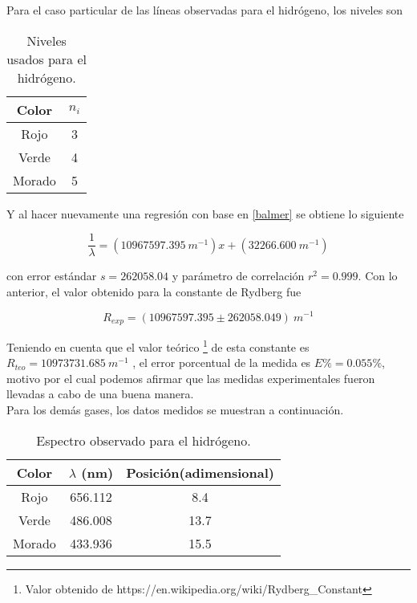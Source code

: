 \documentclass[prb,aps,twocolumn,preprintnumbers,amsmath,amssymb]{revtex4}
\begin{document}
Para el caso particular de las líneas observadas para el hidrógeno, los niveles son 

\begin{table}[h!]
\caption{\label{Tabla 6}Niveles usados para el hidrógeno.}
\begin{ruledtabular}
\begin{tabular}{cc}
Color&$n_{i}$\\
\hline
Rojo &3\\
Verde &4\\
Morado &5\\
\end{tabular}
\end{ruledtabular}
\end{table}

Y al hacer nuevamente una regresión con base en \eqref{balmer} se obtiene lo siguiente

\begin{equation}
\frac{1}{\lambda} = (10967597.395\ m^{-1})x + (32266.600\ m^{-1})
\end{equation}

\noindent
con error estándar $s = 262058.04$ y parámetro de correlación $r^2 = 0.999$. Con lo anterior, el valor obtenido para la constante de Rydberg fue

\begin{equation}
R_{exp} = (10967597.395 \pm 262058.049)\ m^{-1}
\end{equation}

Teniendo en cuenta que el valor teórico \footnote{Valor obtenido de https://en.wikipedia.org/wiki/Rydberg\_Constant}  de esta constante es $R_{teo}  = 10973731.685\ m^{-1}$ , el error porcentual de la medida es $E\% = 0.055\%$, motivo por el cual podemos afirmar que las medidas experimentales fueron llevadas a cabo de una buena manera.\\

Para los demás gases, los datos medidos se muestran a continuación.

\begin{table}[h!]
\caption{\label{Tabla 2}Espectro observado para el hidrógeno.}
\begin{ruledtabular}
\begin{tabular}{ccc}
Color&$\lambda$ (nm)&Posición(adimensional)\\
\hline
Rojo & 656.112 & 8.4\\
Verde & 486.008 & 13.7\\
Morado & 433.936 & 15.5\\
\end{tabular}
\end{ruledtabular}
\end{table}
\end{document}

